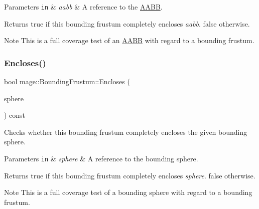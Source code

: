 \begin{DoxyParams}[1]{Parameters}
\mbox{\tt in}  & {\em aabb} & A reference to the \mbox{\hyperlink{classmage_1_1_a_a_b_b}{A\+A\+BB}}. \\
\hline
\end{DoxyParams}
\begin{DoxyReturn}{Returns}
{\ttfamily true} if this bounding frustum completely encloses {\itshape aabb}. {\ttfamily false} otherwise. 
\end{DoxyReturn}
\begin{DoxyNote}{Note}
This is a full coverage test of an \mbox{\hyperlink{classmage_1_1_a_a_b_b}{A\+A\+BB}} with regard to a bounding frustum. 
\end{DoxyNote}
\mbox{\label{classmage_1_1_bounding_frustum_a64bb28f632ae39438424a714809c31de}} 
\subsubsection{\texorpdfstring{Encloses()}{Encloses()}\hspace{0.1cm}{\footnotesize\ttfamily [4/4]}}
{\footnotesize\ttfamily bool mage\+::\+Bounding\+Frustum\+::\+Encloses (\begin{DoxyParamCaption}\item[{const \mbox{\hyperlink{classmage_1_1_bounding_sphere}{Bounding\+Sphere}} \&}]{sphere }\end{DoxyParamCaption}) const\hspace{0.3cm}{\ttfamily [noexcept]}}

Checks whether this bounding frustum completely encloses the given bounding sphere.


\begin{DoxyParams}[1]{Parameters}
\mbox{\tt in}  & {\em sphere} & A reference to the bounding sphere. \\
\hline
\end{DoxyParams}
\begin{DoxyReturn}{Returns}
{\ttfamily true} if this bounding frustum completely encloses {\itshape sphere}. {\ttfamily false} otherwise. 
\end{DoxyReturn}
\begin{DoxyNote}{Note}
This is a full coverage test of a bounding sphere with regard to a bounding frustum. 
\end{DoxyNote}
\mbox{\label{classmage_1_1_bounding_frustum_aeae9c1be8cebf662ccd6615145724dec}} 
